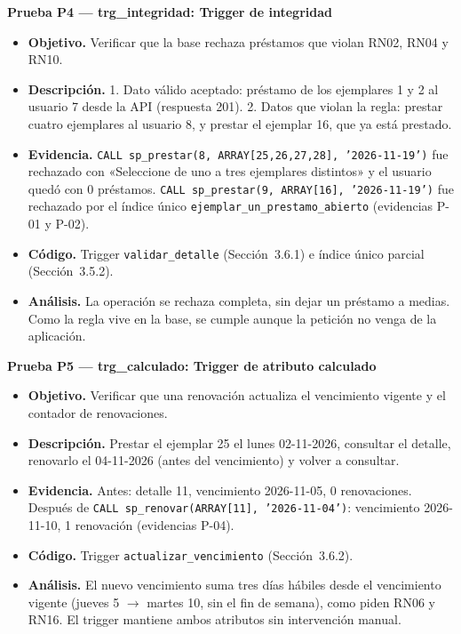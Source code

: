 \documentclass[11pt,a4paper]{article}
\begin{document}
\textbf{Prueba P4 --- trg\_integridad: Trigger de integridad}
\begin{itemize}[nosep]
\item \textbf{Objetivo.} Verificar que la base rechaza préstamos que violan RN02, RN04 y RN10.
\item \textbf{Descripción.} 1. Dato válido aceptado: préstamo de los ejemplares 1 y 2 al usuario 7 desde la API (respuesta 201). 2. Datos que violan la regla: prestar cuatro ejemplares al usuario 8, y prestar el ejemplar 16, que ya está prestado.
\item \textbf{Evidencia.} \texttt{CALL sp\_prestar(8, ARRAY[25,26,27,28], '2026-11-19')} fue rechazado con «Seleccione de uno a tres ejemplares distintos» y el usuario quedó con 0 préstamos. \texttt{CALL sp\_prestar(9, ARRAY[16], '2026-11-19')} fue rechazado por el índice único \texttt{ejemplar\_un\_prestamo\_abierto} (evidencias P-01 y P-02).
\item \textbf{Código.} Trigger \texttt{validar\_detalle} (Sección~3.6.1) e índice único parcial (Sección~3.5.2).
\item \textbf{Análisis.} La operación se rechaza completa, sin dejar un préstamo a medias. Como la regla vive en la base, se cumple aunque la petición no venga de la aplicación.
\end{itemize}

\textbf{Prueba P5 --- trg\_calculado: Trigger de atributo calculado}
\begin{itemize}[nosep]
\item \textbf{Objetivo.} Verificar que una renovación actualiza el vencimiento vigente y el contador de renovaciones.
\item \textbf{Descripción.} Prestar el ejemplar 25 el lunes 02-11-2026, consultar el detalle, renovarlo el 04-11-2026 (antes del vencimiento) y volver a consultar.
\item \textbf{Evidencia.} Antes: detalle 11, vencimiento 2026-11-05, 0 renovaciones. Después de \texttt{CALL sp\_renovar(ARRAY[11], '2026-11-04')}: vencimiento 2026-11-10, 1 renovación (evidencias P-04).
\item \textbf{Código.} Trigger \texttt{actualizar\_vencimiento} (Sección~3.6.2).
\item \textbf{Análisis.} El nuevo vencimiento suma tres días hábiles desde el vencimiento vigente (jueves 5 $\to$ martes 10, sin el fin de semana), como piden RN06 y RN16. El trigger mantiene ambos atributos sin intervención manual.
\end{itemize}
\end{document}
